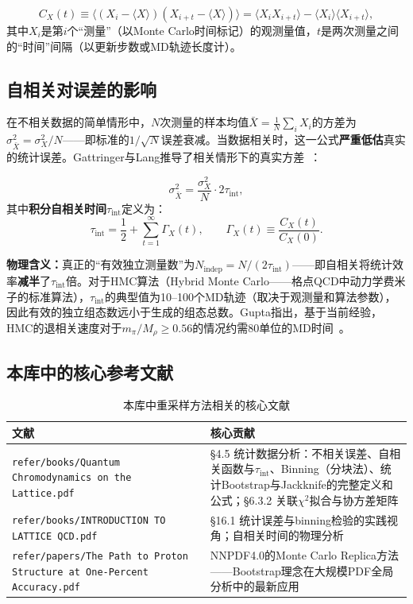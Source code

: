 \documentclass[12pt,a4paper]{ctexart}
\theoremstyle{definition}
\begin{document}
\begin{equation}
C_X(t) \equiv \langle (X_i - \langle X\rangle)(X_{i+t} - \langle X\rangle) \rangle = \langle X_i X_{i+t} \rangle - \langle X_i\rangle\langle X_{i+t}\rangle,
\label{eq:autocorr_func}
\end{equation}
其中$X_i$是第$i$个``测量''（以Monte Carlo时间标记）的观测量值，$t$是两次测量之间的``时间''间隔（以更新步数或MD轨迹长度计）。

\subsection{自相关对误差的影响}

在不相关数据的简单情形中，$N$次测量的样本均值$\bar X = \frac{1}{N}\sum_i X_i$的方差为$\sigma^2_{\bar X} = \sigma_X^2 / N$——即标准的$1/\sqrt{N}$误差衰减。当数据相关时，这一公式\textbf{严重低估}真实的统计误差。Gattringer与Lang推导了相关情形下的真实方差~\cite{GattringerLang2010}：

\begin{equation}
\boxed{\sigma^2_{\bar X} = \frac{\sigma_X^2}{N} \cdot 2\tau_{\text{int}}},
\label{eq:correlated_variance}
\end{equation}
其中\textbf{积分自相关时间}$\tau_{\text{int}}$定义为：
\begin{equation}
\tau_{\text{int}} = \frac{1}{2} + \sum_{t=1}^\infty \Gamma_X(t), \qquad \Gamma_X(t) \equiv \frac{C_X(t)}{C_X(0)}.
\label{eq:tau_int}
\end{equation}

\textbf{物理含义：}真正的``有效独立测量数''为$N_{\text{indep}} = N/(2\tau_{\text{int}})$——即自相关将统计效率\textbf{减半}了$\tau_{\text{int}}$倍。对于HMC算法（Hybrid Monte Carlo——格点QCD中动力学费米子的标准算法），$\tau_{\text{int}}$的典型值为10--100个MD轨迹（取决于观测量和算法参数），因此有效的独立组态数远小于生成的组态总数。Gupta指出，基于当前经验，HMC的退相关速度对于$m_\pi/M_\rho \ge 0.56$的情况约需80单位的MD时间~\cite{Gupta1997intro}。

\subsection{本库中的核心参考文献}

\begin{table}[H]
\centering
\caption{本库中重采样方法相关的核心文献}
\label{tab:rs_papers}
\small
\begin{tabular}{lp{9cm}}
\toprule
文献 & 核心贡献 \\
\midrule
\texttt{refer/books/Quantum Chromodynamics on the Lattice.pdf} & §4.5 统计数据分析：不相关误差、自相关函数与$\tau_{\text{int}}$、Binning（分块法）、统计Bootstrap与Jackknife的完整定义和公式；§6.3.2 关联$\chi^2$拟合与协方差矩阵 \\
\texttt{refer/books/INTRODUCTION TO LATTICE QCD.pdf} & §16.1 统计误差与binning检验的实践视角；自相关时间的物理分析 \\
\texttt{refer/papers/The Path to Proton Structure at One-Percent Accuracy.pdf} &
NNPDF4.0的Monte Carlo Replica方法——Bootstrap理念在大规模PDF全局分析中的最新应用 \\
\bottomrule
\end{tabular}
\end{table}
\end{document}
